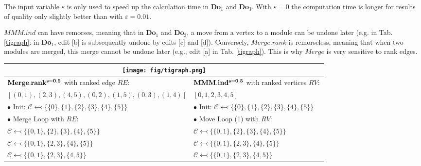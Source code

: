 \documentclass[12pt]{article}
\theoremstyle{thmstyleone}%
\theoremstyle{definition}
\begin{document}
\vspace{0.20cm}
The input variable $\varepsilon$ is only used to speed up the calculation time in {\bf Do$_1$} and {\bf Do$_3$}.
With $\varepsilon=0$ the computation time is longer for results of quality only slightly better than with $\varepsilon=0.01$.

$MMM.ind$ can have remorses, meaning that in {\bf Do$_1$} and {\bf Do$_3$}, a move from a vertex to a module can be undone later (e.g. in Tab. \ref{tigraph}: in {\bf Do$_1$}, edit [b] is subsequently undone by edits [c] and [d]).
%
Conversely, $Merge.rank$ is remorseless, meaning that when two modules are merged, this merge cannot be undone later (e.g., edit [a] in Tab. \ref{tigraph}). This is why $Merge$ is very sensitive to rank edges.
%

\begin{table}[!ht]
\centering
\normalsize
\begin{tabular}{| l | l |}
\hline
\multicolumn{2}{|c|}{\texttt{[image: fig/tigraph.png]}}\\

\hline
$\bf Merge.rank^{s=0.5}$ with ranked edge $RE:$& $\bf MMM.ind^{s=0.5}$ with ranked vertices $RV:$\\

\small $[(0,1),(2,3),(4,5),(0,2),(1,5),(0,3),(1,4)]$\normalsize & \small $[0,1,2,3,4,5]$\normalsize\\
\hline
$\bullet$ Init: $\mathcal{C}\leftarrowtail\big\{\{0\}, \{1\}, \{2\}, \{3\}, \{4\}, \{5\}\big\}$ & $\bullet$ Init: $\mathcal{C}\leftarrowtail\big\{\{0\}, \{1\}, \{2\}, \{3\}, \{4\}, \{5\}\big\}$ \\
$\bullet$ Merge Loop with $RE$: & $\bullet$ Move Loop (1) with $RV$: \\

\hspace{0.5cm} $\mathcal{C}\leftarrowtail\big\{\{0,1\}, \{2\}, \{3\}, \{4\}, \{5\}\big\}$ \color{red}{[a]}& \hspace{0.5cm} $\mathcal{C}\leftarrowtail\big\{\{0,1\}, \{2\}, \{3\}, \{4\}, \{5\}\big\}$ \color{red}{[b]}\\

\hspace{0.5cm} $\mathcal{C}\leftarrowtail\big\{\{0,1\}, \{2,3\}, \{4\}, \{5\}\big\}$ & \hspace{0.5cm} $\mathcal{C}\leftarrowtail\big\{\{0,1\}, \{2,3\}, \{4\}, \{5\}\big\}$\\

\hspace{0.5cm} $\mathcal{C}\leftarrowtail\big\{\{0,1\}, \{2,3\}, \{4,5\}\big\}$ & \hspace{0.5cm} $\mathcal{C}\leftarrowtail\big\{\{0,1\}, \{2,3\}, \{4,5\}\big\}$\\


\end{tabular}
\end{table}
\end{document}
